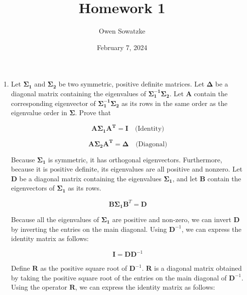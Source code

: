 \documentclass[fleqn]{article}
\title{Homework 1}
\author{Owen Sowatzke}
\date{February 7, 2024}
\newcommand{\zerodisplayskip}{
	\setlength{\abovedisplayskip}{0pt}%
	\setlength{\belowdisplayskip}{0pt}%
	\setlength{\abovedisplayshortskip}{0pt}%
	\setlength{\belowdisplayshortskip}{0pt}%
	\setlength{\mathindent}{0pt}}
\begin{document}
	\offinterlineskip
	\setlength{\lineskip}{12pt}
	\zerodisplayskip
	\maketitle
	
	\begin{enumerate}
		\item Let $\mathbf{\Sigma_1}$ and $\mathbf{\Sigma_2}$ be two symmetric, positive definite matrices. Let $\mathbf{\Delta}$ be a diagonal matrix containing the eigenvalues of $\mathbf{\Sigma_1^{-1}}\mathbf{\Sigma_2}$. Let $\mathbf{A}$ contain the corresponding eigenvector of $\mathbf{\Sigma_1^{-1}}\mathbf{\Sigma_2}$ as its rows in the same order as the eigenvalue order in $\mathbf{\Sigma}$. Prove that
		
		\begin{equation*}
			\mathbf{A\Sigma_1A^T} = \mathbf{I}\quad\text{(Identity)}
		\end{equation*}
		
		\begin{equation*}
			\mathbf{A\Sigma_2A^T} = \mathbf{\Delta}\quad\text{(Diagonal)}
		\end{equation*}
		
		Because $\mathbf{\Sigma_1}$ is symmetric, it has orthogonal eigenvectors. Furthermore, because it is positive definite, its eigenvalues are all positive and nonzero. Let $\mathbf{D}$ be a diagonal matrix containing the eigenvalues $\mathbf{\Sigma_1}$, and let $\mathbf{B}$ contain the eigenvectors of $\mathbf{\Sigma_1}$ as its rows.
		
		\begin{equation*}
			\mathbf{B}\mathbf{\Sigma_1}\mathbf{B}^T = \mathbf{D} 
		\end{equation*}
		
		Because all the eigenvalues of $\mathbf{\Sigma_1}$ are positive and non-zero, we can invert $\mathbf{D}$ by inverting the entries on the main diagonal. Using $\mathbf{D}^{-1}$, we can express the identity matrix as follows:
		
		\begin{equation*}
			\mathbf{I} = \mathbf{D}\mathbf{D}^{-1}
		\end{equation*}
		
		Define $\mathbf{R}$ as the positive square root of $\mathbf{D}^{-1}$. $\mathbf{R}$ is a diagonal matrix obtained by taking the positive square root of the entries on the main diagonal of $\mathbf{D}^{-1}$. Using the operator $\mathbf{R}$, we can express the identity matrix as follows:
		

\end{enumerate}
\end{document}
